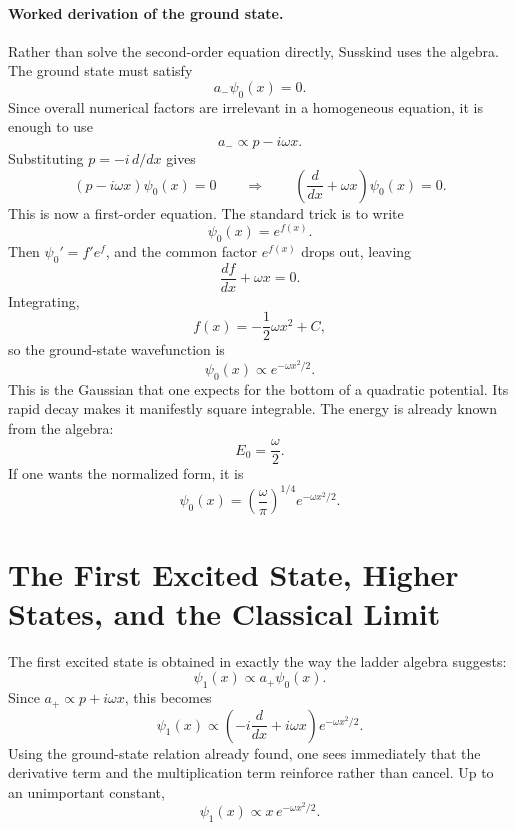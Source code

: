 \paragraph{Worked derivation of the ground state.}
Rather than solve the second-order equation directly, Susskind uses the algebra. The ground state must satisfy
\begin{equation}
a_{-}\psi_{0}(x)=0.
\end{equation}
Since overall numerical factors are irrelevant in a homogeneous equation, it is enough to use
\[
a_{-}\propto p-i\omega x.
\]
Substituting \(p=-i\,d/dx\) gives
\begin{equation}
(p-i\omega x)\psi_{0}(x)=0
\qquad\Longrightarrow\qquad
\left(\frac{d}{dx}+\omega x\right)\psi_{0}(x)=0.
\end{equation}
This is now a first-order equation. The standard trick is to write
\begin{equation}
\psi_{0}(x)=e^{f(x)}.
\end{equation}
Then \(\psi_{0}'=f'e^{f}\), and the common factor \(e^{f(x)}\) drops out, leaving
\begin{equation}
\frac{df}{dx}+\omega x=0.
\end{equation}
Integrating,
\begin{equation}
f(x)=-\frac{1}{2}\omega x^{2}+C,
\end{equation}
so the ground-state wavefunction is
\begin{equation}
\psi_{0}(x)\propto e^{-\omega x^{2}/2}.
\end{equation}
This is the Gaussian that one expects for the bottom of a quadratic potential. Its rapid decay makes it manifestly square integrable. The energy is already known from the algebra:
\begin{equation}
E_{0}=\frac{\omega}{2}.
\end{equation}
If one wants the normalized form, it is
\begin{equation}
\psi_{0}(x)=\left(\frac{\omega}{\pi}\right)^{1/4}e^{-\omega x^{2}/2}.
\end{equation}

\section{The First Excited State, Higher States, and the Classical Limit}

The first excited state is obtained in exactly the way the ladder algebra suggests:
\begin{equation}
\psi_{1}(x)\propto a_{+}\psi_{0}(x).
\end{equation}
Since \(a_{+}\propto p+i\omega x\), this becomes
\begin{equation}
\psi_{1}(x)\propto \left(-i\frac{d}{dx}+i\omega x\right)e^{-\omega x^{2}/2}.
\end{equation}
Using the ground-state relation already found, one sees immediately that the derivative term and the multiplication term reinforce rather than cancel. Up to an unimportant constant,
\begin{equation}
\psi_{1}(x)\propto x\,e^{-\omega x^{2}/2}.
\end{equation}

